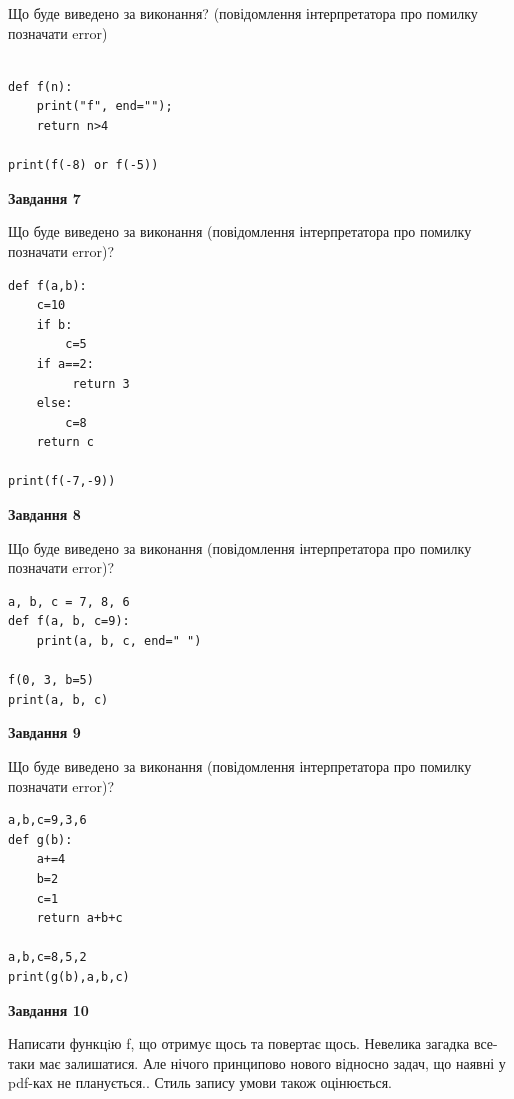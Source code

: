 \documentclass[12pt, ukrainian]{article}
\begin{document}
{\begin {large}
Що буде виведено за виконання? (повідомлення інтерпретатора про помилку позначати error)\par
\begin{verbatim}

def f(n):
    print("f", end="");
    return n>4

print(f(-8) or f(-5))
\end{verbatim}

{\begin {center}\textbf{Завдання 7}\end {center}}

Що буде виведено за виконання (повідомлення інтерпретатора про помилку позначати error)?\par
\begin{verbatim}
def f(a,b):
    c=10
    if b:
        c=5
    if a==2:
         return 3
    else: 
        c=8
    return c

print(f(-7,-9))
\end{verbatim}

{\begin {center}\textbf{Завдання 8}\end {center}}

Що буде виведено за виконання (повідомлення інтерпретатора про помилку позначати error)?\par
\begin{verbatim}
a, b, c = 7, 8, 6
def f(a, b, c=9):
    print(a, b, c, end=" ")

f(0, 3, b=5)
print(a, b, c)
\end{verbatim}

{\begin {center}\textbf{Завдання 9}\end {center}}

Що буде виведено за виконання (повідомлення інтерпретатора про помилку позначати error)?\par
\begin{verbatim}
a,b,c=9,3,6
def g(b):
    a+=4
    b=2
    c=1
    return a+b+c

a,b,c=8,5,2
print(g(b),a,b,c)
\end{verbatim}

{\begin {center}\textbf{Завдання 10}\end {center}}


Написати функцiю f, що отримує щось та повертає щось. Невелика загадка все-таки має залишатися. Але нічого принципово нового відносно задач, що наявні у pdf-ках не планується.. Стиль запису умови також оцінюється.\par
\end {large}}
\newpage
\end{document}
